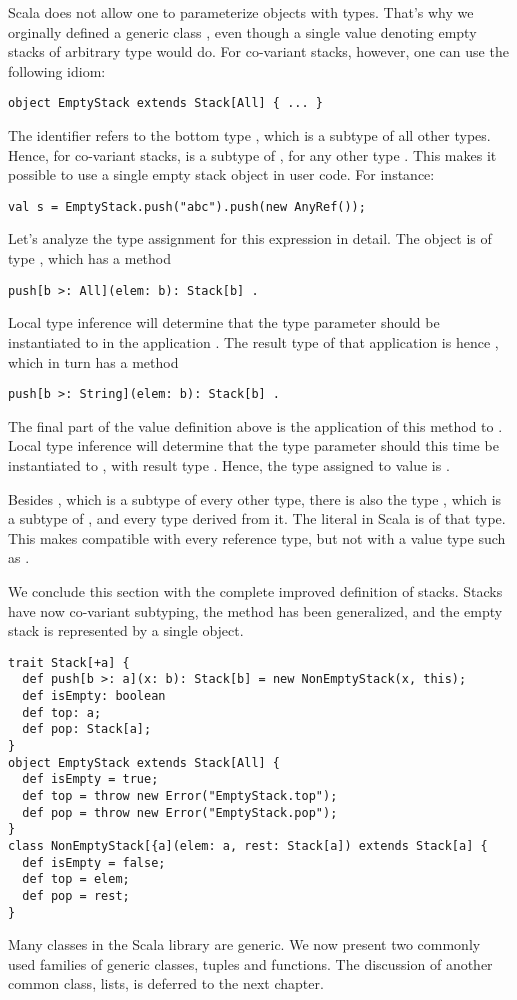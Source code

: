 \documentclass[a4paper,12pt,twoside,titlepage]{book}
\begin{document}
Scala does not allow one to parameterize objects with types. That's
why we orginally defined a generic class , even
though a single value denoting empty stacks of arbitrary type would
do. For co-variant stacks, however, one can use the following idiom:
\begin{lstlisting}
object EmptyStack extends Stack[All] { ... }
\end{lstlisting}
The identifier  refers to the bottom type ,
which is a subtype of all other types. Hence, for co-variant stacks,
 is a subtype of , for any other type
. This makes it possible to use a single empty stack object
in user code. For instance:
\begin{lstlisting}
val s = EmptyStack.push("abc").push(new AnyRef());
\end{lstlisting}
Let's analyze the type assignment for this expression in detail.  The
 object is of type , which has a
method
\begin{lstlisting}
push[b >: All](elem: b): Stack[b] .
\end{lstlisting}
Local type inference will determine that the type parameter 
should be instantiated to  in the application 
. The result type of that application is hence
, which in turn has a method
\begin{lstlisting}
push[b >: String](elem: b): Stack[b] .
\end{lstlisting}
The final part of the value definition above is the application of
this method to . Local type inference will
determine that the type parameter  should this time be
instantiated to , with result type .
Hence, the type assigned to value  is .

Besides , which is a subtype of every other type,
there is also the type , which is a subtype of
, and every type derived from it. The 
literal in Scala is of that type. This makes  compatible
with every reference type, but not with a value type such as
.

We conclude this section with the complete improved definition of
stacks. Stacks have now co-variant subtyping, the  method
has been generalized, and the empty stack is represented by a single
object.
\begin{lstlisting}
trait Stack[+a] {
  def push[b >: a](x: b): Stack[b] = new NonEmptyStack(x, this);
  def isEmpty: boolean
  def top: a;
  def pop: Stack[a];
}
object EmptyStack extends Stack[All] {
  def isEmpty = true;
  def top = throw new Error("EmptyStack.top");
  def pop = throw new Error("EmptyStack.pop");
}
class NonEmptyStack[{a](elem: a, rest: Stack[a]) extends Stack[a] {
  def isEmpty = false;
  def top = elem;
  def pop = rest;
}
\end{lstlisting}
Many classes in the Scala library are generic. We now present two
commonly used families of generic classes, tuples and functions. The
discussion of another common class, lists, is deferred to the next
chapter.
\end{document}
